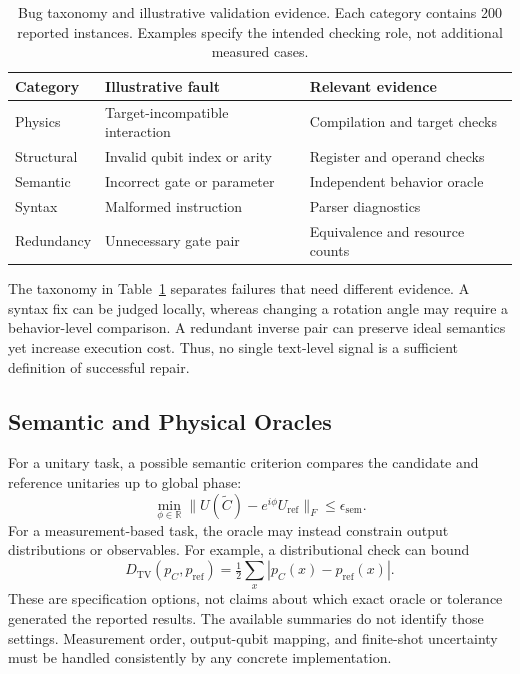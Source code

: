 \documentclass[conference]{IEEEtran}
\begin{document}
\begin{table}[t]
\caption{Bug taxonomy and illustrative validation evidence. Each category contains 200 reported instances. Examples specify the intended checking role, not additional measured cases.}
\label{tab:taxonomy}
\centering\footnotesize
\setlength{\tabcolsep}{4pt}
\begin{tabular}{@{}>{\raggedright\arraybackslash}p{}>{\raggedright\arraybackslash}p{}>{\raggedright\arraybackslash}p{}@{}}
\toprule
Category & Illustrative fault & Relevant evidence\\
\midrule
Physics & Target-incompatible interaction & Compilation and target checks\\
Structural & Invalid qubit index or arity & Register and operand checks\\
Semantic & Incorrect gate or parameter & Independent behavior oracle\\
Syntax & Malformed instruction & Parser diagnostics\\
Redundancy & Unnecessary gate pair & Equivalence and resource counts\\
\bottomrule
\end{tabular}
\end{table}

The taxonomy in Table~\ref{tab:taxonomy} separates failures that need different evidence. A syntax fix can be judged locally, whereas changing a rotation angle may require a behavior-level comparison. A redundant inverse pair can preserve ideal semantics yet increase execution cost. Thus, no single text-level signal is a sufficient definition of successful repair.

\subsection{Semantic and Physical Oracles}
For a unitary task, a possible semantic criterion compares the candidate and reference unitaries up to global phase:
\begin{equation}
 \min_{\phi\in\mathbb R}\|U(\widetilde C)-e^{i\phi}U_{\mathrm{ref}}\|_{F}
 \leq \epsilon_{\mathrm{sem}}.
\end{equation}
For a measurement-based task, the oracle may instead constrain output distributions or observables. For example, a distributional check can bound
\begin{equation}
 D_{\mathrm{TV}}(p_C,p_{\mathrm{ref}})
 =\tfrac12\sum_x|p_C(x)-p_{\mathrm{ref}}(x)|.
\end{equation}
These are specification options, not claims about which exact oracle or tolerance generated the reported results. The available summaries do not identify those settings. Measurement order, output-qubit mapping, and finite-shot uncertainty must be handled consistently by any concrete implementation.
\end{document}
